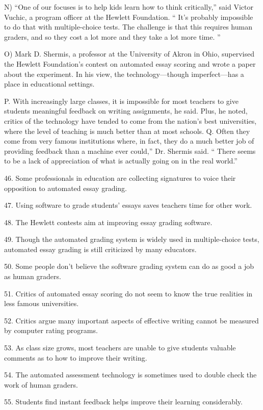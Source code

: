 \documentclass[UTF8,11pt]{ctexart}
\begin{document}
N) “One of our focuses is to help kids learn how to think critically,” said Victor Vuchic, a program officer at the Hewlett Foundation. “ It’s probably impossible to do that with multiple-choice tests. The challenge is that this requires human graders, and so they cost a lot more and they take a lot more time. ”


O) Mark D. Shermis, a professor at the University of Akron in Ohio, supervised the Hewlett Foundation’s contest on automated essay scoring and wrote a paper about the experiment. In his view, the technology—though imperfect—has a place in educational settings.


P. With increasingly large classes, it is impossible for most teachers to give students meaningful feedback on writing assignments, he said. Plus, he noted, critics of the technology have tended to come from the nation’s best universities, where the level of teaching is much better than at most schools. Q. Often they come from very famous institutions where, in fact, they do a much better job of providing feedback than a machine ever could,” Dr. Shermis said. “ There seems to be a lack of appreciation of what is actually going on in the real world.”


46. Some professionals in education are collecting signatures to voice their opposition to automated essay grading.


47. Using software to grade students’ essays saves teachers time for other work.


48. The Hewlett contests aim at improving essay grading software.


49. Though the automated grading system is widely used in multiple-choice tests, automated essay grading is still criticized by many educators.


50. Some people don’t believe the software grading system can do as good a job as human graders.


51. Critics of automated essay scoring do not seem to know the true realities in less famous universities.


52. Critics argue many important aspects of effective writing cannot be measured by computer rating programs.


53. As class size grows, most teachers are unable to give students valuable comments as to how to improve their writing.


54. The automated assessment technology is sometimes used to double check the work of human graders.


55. Students find instant feedback helps improve their learning considerably.
\end{document}
